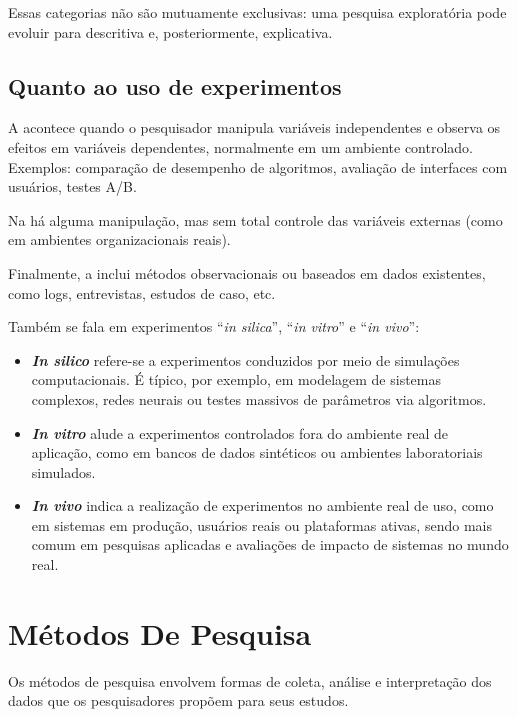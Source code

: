 Essas categorias não são mutuamente exclusivas: uma pesquisa exploratória pode evoluir para descritiva e, posteriormente, explicativa.

\subsection{Quanto ao uso de experimentos}

A  acontece quando o pesquisador manipula variáveis independentes e observa os efeitos em variáveis dependentes, normalmente em um ambiente controlado. Exemplos: comparação de desempenho de algoritmos, avaliação de interfaces com usuários, testes A/B.

Na  há alguma manipulação, mas sem total controle das variáveis externas (como em ambientes organizacionais reais).

Finalmente, a   inclui métodos observacionais ou baseados em dados existentes, como logs, entrevistas, estudos de caso, etc.

Também se fala em experimentos ``\textit{in silica}'', ``\textit{in vitro}'' e ``\textit{in vivo}'':
\begin{itemize}
\item \textbf{\textit{In silico}} refere-se a experimentos conduzidos por meio de simulações computacionais. É típico, por exemplo, em modelagem de sistemas complexos, redes neurais ou testes massivos de parâmetros via algoritmos.
\item \textbf{\textit{In vitro}} alude a experimentos controlados fora do ambiente real de aplicação, como em bancos de dados sintéticos ou ambientes laboratoriais simulados.
\item \textbf{\textit{In vivo}} indica a realização de experimentos no ambiente real de uso, como em sistemas em produção, usuários reais ou plataformas ativas, sendo mais comum em pesquisas aplicadas e avaliações de impacto de sistemas no mundo real.
\end{itemize}

\section{Métodos De Pesquisa}

Os métodos de pesquisa envolvem formas de coleta, análise e interpretação dos dados que os pesquisadores propõem para seus estudos\citep{creswell2021projeto}.

